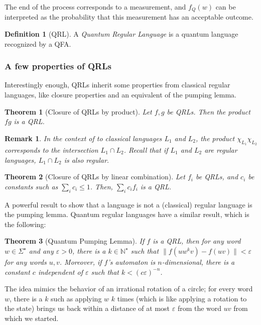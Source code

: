 \documentclass[12pt,a4paper]{article}
\theoremstyle{plain}
\newtheorem*{theorem}{Theorem}
\newtheorem*{remark}{Remark}
\theoremstyle{definition}
\newtheorem*{definition}{Definition}
\begin{document}
The end of the process corresponds to a measurement, and $f_Q(w)$ can be interpreted as the probability that this measurement has an acceptable outcome. 

\begin{definition}[QRL]
    A \emph{Quantum Regular Language} is a quantum language recognized by a QFA.
\end{definition}

\subsubsection{A few properties of QRLs}
Interestingly enough, QRLs inherit some properties from classical regular languages, like closure properties and an equivalent of the pumping lemma.

\begin{theorem}[Closure of QRLs by product]
    Let $f, g$ be QRLs. Then the product $fg$ is a QRL.
\end{theorem}

\begin{remark}
    In the context of to classical languages $L_1$ and $L_2$, the product $\chi_{L_1}\chi_{L_2}$ corresponds to the intersection $L_1\cap L_2$. Recall that if $L_1$ and $L_2$ are regular languages, $L_1\cap L_2$ is also regular.
\end{remark}

\begin{theorem}[Closure of QRLs by linear combination]
    Let $f_i$ be QRLs, and $c_i$ be constants such as $\sum_i c_i \leq 1$. Then, $\sum_i c_if_i$ is a QRL.
\end{theorem}

A powerful result to show that a language is not a (classical) regular language is the pumping lemma. Quantum regular languages have a similar result, which is the following:
\begin{theorem}[Quantum Pumping Lemma]
    If $f$ is a QRL, then for any word $w\in\Sigma^\star$ and any $\varepsilon > 0$, there is a $k\in \mathbb{N}^\star$ such that $\|f(uw^kv) - f(uv)\| < \varepsilon$ for any words $u, v$. Moreover, if $f$'s automaton is $n$-dimensional, there is a constant $c$ independent of $\varepsilon$ such that $k < (c\varepsilon)^{-n}$.
\end{theorem}
The idea mimics the behavior of an irrational rotation of a circle; for every word $w$, there is a $k$ such as applying $w$ $k$ times (which is like applying a rotation to the state) brings us back within a distance of at most $\varepsilon$ from the word $uv$ from which we started.
\end{document}
